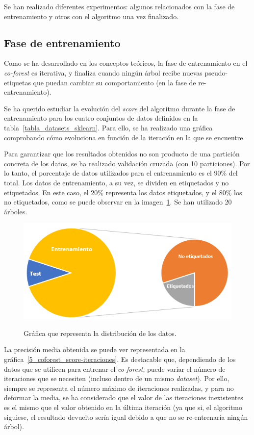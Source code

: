 Se han realizado diferentes experimentos: algunos relacionados con la fase de entrenamiento y otros con el algoritmo una vez finalizado.

\subsection{Fase de entrenamiento}

Como se ha desarrollado en los conceptos teóricos, la fase de entrenamiento en el \textit{co-forest} es iterativa, y finaliza cuando ningún árbol recibe nuevas pseudo-etiquetas que puedan cambiar su comportamiento (en la fase de re-entrenamiento).

Se ha querido estudiar la evolución del \textit{score} del algoritmo durante la fase de entrenamiento para los cuatro conjuntos de datos definidos en la tabla~\ref{tabla_datasets_sklearn}. Para ello, se ha realizado una gráfica comprobando cómo evoluciona en función de la iteración en la que se encuentre.

Para garantizar que los resultados obtenidos no son producto de una partición concreta de los datos, se ha realizado validación cruzada (con 10 particiones). Por lo tanto, el porcentaje de datos utilizados para el entrenamiento es el $90\%$ del total. Los datos de entrenamiento, a su vez, se dividen en etiquetados y no etiquetados. En este caso, el $20\%$ representa los datos etiquetados, y el $80\%$ los no etiquetados, como se puede observar en la imagen~\ref{5_entrenamiento_particiones}. Se han utilizado 20 árboles.

\begin{figure}[h]
	\caption{Gráfica que representa la distribución de los datos.}
	\centering
	\includegraphics[width=\textwidth]{../img/memoria/5_entrenamiento_particiones}
	\label{5_entrenamiento_particiones}
\end{figure}


 La precisión media obtenida se puede ver representada en la gráfica~\ref{5_coforest_score-iteraciones}. Es destacable que, dependiendo de los datos que se utilicen para entrenar el \textit{co-forest}, puede variar el número de iteraciones que se necesiten (incluso dentro de un mismo \textit{dataset}). Por ello, siempre se representa el número máximo de iteraciones realizadas, y para no deformar la media, se ha considerado que el valor de las iteraciones inexistentes es el mismo que el valor obtenido en la última iteración (ya que si, el algoritmo siguiese, el resultado devuelto sería igual debido a que no se re-entrenaría ningún árbol).

